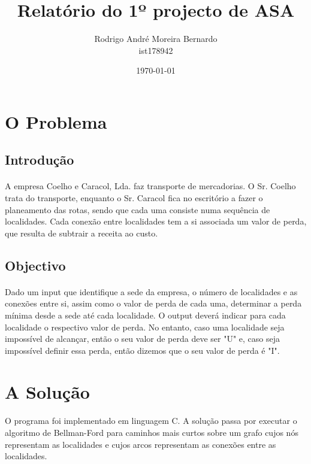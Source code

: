 \documentclass[12pt, a4paper]{article}
\title{\textbf{Relatório do 1º projecto de ASA}}
\author{Rodrigo André Moreira Bernardo \\ ist178942}
\affil{Instituto Superior Técnico}
\date{\today}
\begin{document}
\maketitle

\section{O Problema}

\subsection{Introdução}
\paragraph{}
A empresa Coelho e Caracol, Lda. faz transporte de mercadorias. O Sr. Coelho
trata do transporte, enquanto o Sr. Caracol fica no escritório a fazer o
planeamento das rotas, sendo que cada uma consiste numa sequência de
localidades. Cada conexão entre localidades tem a si associada um valor de
perda, que resulta de subtrair a receita ao custo.

\subsection{Objectivo}
\paragraph{}
Dado um input que identifique a sede da empresa, o número de localidades e as
conexões entre si, assim como o valor de perda de cada uma, determinar a perda
mínima desde a sede até cada localidade. O output deverá indicar para cada
localidade o respectivo valor de perda. No entanto, caso uma localidade seja
impossível de alcançar, então o seu valor de perda deve ser "U" e, caso seja
impossível definir essa perda, então dizemos que o seu valor de perda é "I".

\section{A Solução}
\paragraph{}
O programa foi implementado em linguagem C.
A solução passa por executar o algoritmo de Bellman-Ford para caminhos mais
curtos sobre um grafo cujos nós representam as localidades e cujos arcos
representam as conexões entre as localidades.
\end{document}
